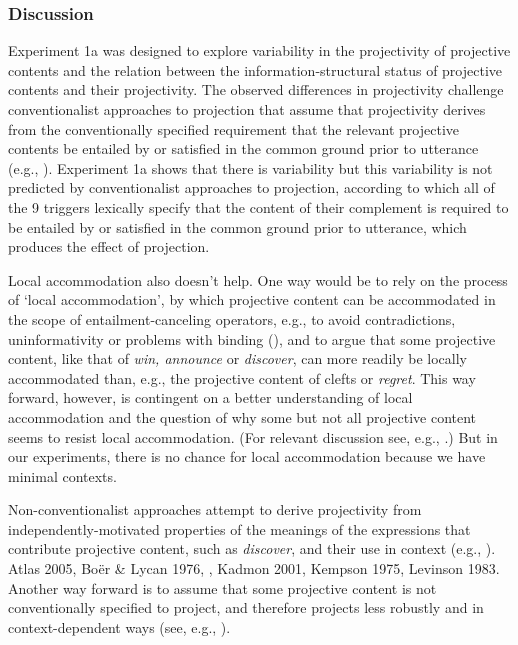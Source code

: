 \documentclass[11pt,fleqn]{article}
\newcommand{\6}{\mbox{$[\hspace*{-.6mm}[$}}
\newcommand{\9}{\mbox{$]\hspace*{-.6mm}]$}}
\begin{document}
\newpage


\subsubsection{Discussion}

Experiment 1a was designed to explore variability in the projectivity of projective contents and the relation between the information-structural status of projective contents and their projectivity. The observed differences in projectivity challenge conventionalist approaches to projection that assume that projectivity derives from the conventionally specified requirement that the relevant projective contents be entailed by or satisfied in the common ground prior to utterance (e.g., \citealt{heim83,vds92}). Experiment 1a shows that there is variability but this variability is not predicted by conventionalist approaches to projection, according to which all of the 9 triggers lexically specify that the content of their complement is required to be entailed by or satisfied in the common ground prior to utterance, which produces the effect of projection.

Local accommodation also doesn't help. One way would be to rely on the process of `local accommodation', by which projective content can be accommodated in the scope of entailment-canceling operators, e.g., to avoid contradictions, uninformativity or problems with binding (\citealt{heim83,vds92}), and to argue that some projective content, like that of {\em win, announce} or {\em discover}, can more readily be locally accommodated than, e.g., the projective content of clefts or {\em regret}. This way forward, however, is contingent on a better understanding of local accommodation and the question of why some but not all projective content seems to resist local accommodation. (For relevant discussion see, e.g., \citealt{beaver-zeevat07}.)  But in our experiments, there is no chance for local accommodation because we have minimal contexts. 

Non-conventionalist approaches attempt to derive projectivity from independently-motivated properties of the meanings of the expressions that contribute projective content, such as {\em discover}, and their use in context (e.g., \citealt{stalnaker74,wilson75,simons01,simons04,abusch10,abrusan2011,best-question}). Atlas  2005,  Bo\"er  \&  Lycan  1976,  \citealt{ccmg90},  Kadmon  2001,  Kempson 1975, Levinson 1983. Another way forward is to assume that some projective content is not conventionally specified to project, and therefore projects less robustly and in context-dependent ways (see, e.g., \citealt{simons01,abusch10,abrusan2011,best-question}).
\end{document}
